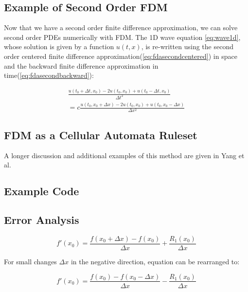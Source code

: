 {\subsection{Example of Second Order FDM}

Now that we have a second order finite difference approximation, we can solve second order PDEs numerically with FDM.  The 1D wave equation \ref{eq:wave1d}, whose solution is given by a function $u(t, x)$, is re-written using the second order centered finite difference approximation(\ref{eq:fdasecondcentered}) in space and the backward finite difference approximation in time(\ref{eq:fdasecondbackward}):

 \begin{equation}
 \begin{split}
  \frac{u(t_{0} + \Delta  t, x_{0}) - 2u(t_{0}, x_{0}) +u(t_{0} - \Delta  t, x_{0})}{\Delta  t^{2}}\\
 = c  \frac{u(t_0, x_{0} + \Delta  x) - 2u(t_0, x_{0}) +u(t_0, x_{0} - \Delta  x) }{\Delta  x^{2}}
 \end{split}
  \end{equation}

\subsection{FDM as a Cellular Automata Ruleset}


A longer discussion and additional examples of this method are given in Yang et al\cite{Yang2010}.

\subsection{Example Code}

\subsection{Error Analysis}

 \begin{equation}
 f'(x_{0}) = \frac{f(x_{0} + \Delta  x) - f(x_{0})}{\Delta  x} + \frac{R_{1}(x_{0})}{\Delta  x}
  \end{equation}
  
For small changes $\Delta  x$ in the negative direction, equation  can be rearranged to:

 \begin{equation}
 f'(x_{0}) = \frac{f(x_{0}) - f(x_{0} - \Delta  x)}{\Delta  x} - \frac{R_{1}(x_{0})}{\Delta  x}
  \end{equation}
  
}
